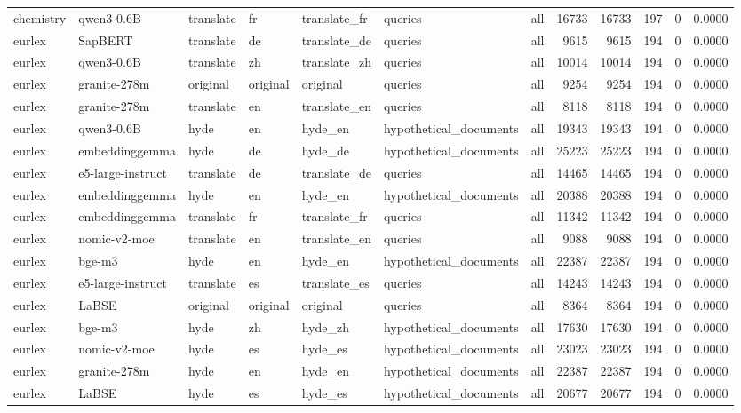 \begin{tabular}{lllllllrrrrr}
chemistry & qwen3-0.6B & translate & fr & translate\_fr & queries & all & 16733 & 16733 & 197 & 0 & 0.0000 \\
eurlex & SapBERT & translate & de & translate\_de & queries & all & 9615 & 9615 & 194 & 0 & 0.0000 \\
eurlex & qwen3-0.6B & translate & zh & translate\_zh & queries & all & 10014 & 10014 & 194 & 0 & 0.0000 \\
eurlex & granite-278m & original & original & original & queries & all & 9254 & 9254 & 194 & 0 & 0.0000 \\
eurlex & granite-278m & translate & en & translate\_en & queries & all & 8118 & 8118 & 194 & 0 & 0.0000 \\
eurlex & qwen3-0.6B & hyde & en & hyde\_en & hypothetical\_documents & all & 19343 & 19343 & 194 & 0 & 0.0000 \\
eurlex & embeddinggemma & hyde & de & hyde\_de & hypothetical\_documents & all & 25223 & 25223 & 194 & 0 & 0.0000 \\
eurlex & e5-large-instruct & translate & de & translate\_de & queries & all & 14465 & 14465 & 194 & 0 & 0.0000 \\
eurlex & embeddinggemma & hyde & en & hyde\_en & hypothetical\_documents & all & 20388 & 20388 & 194 & 0 & 0.0000 \\
eurlex & embeddinggemma & translate & fr & translate\_fr & queries & all & 11342 & 11342 & 194 & 0 & 0.0000 \\
eurlex & nomic-v2-moe & translate & en & translate\_en & queries & all & 9088 & 9088 & 194 & 0 & 0.0000 \\
eurlex & bge-m3 & hyde & en & hyde\_en & hypothetical\_documents & all & 22387 & 22387 & 194 & 0 & 0.0000 \\
eurlex & e5-large-instruct & translate & es & translate\_es & queries & all & 14243 & 14243 & 194 & 0 & 0.0000 \\
eurlex & LaBSE & original & original & original & queries & all & 8364 & 8364 & 194 & 0 & 0.0000 \\
eurlex & bge-m3 & hyde & zh & hyde\_zh & hypothetical\_documents & all & 17630 & 17630 & 194 & 0 & 0.0000 \\
eurlex & nomic-v2-moe & hyde & es & hyde\_es & hypothetical\_documents & all & 23023 & 23023 & 194 & 0 & 0.0000 \\
eurlex & granite-278m & hyde & en & hyde\_en & hypothetical\_documents & all & 22387 & 22387 & 194 & 0 & 0.0000 \\
eurlex & LaBSE & hyde & es & hyde\_es & hypothetical\_documents & all & 20677 & 20677 & 194 & 0 & 0.0000 \\

\end{tabular}
